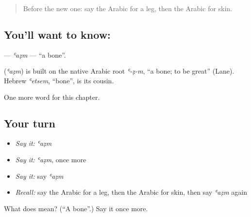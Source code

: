 \label{lesson:AR-C141-azm}



\begin{quote}
Before the new one: say the Arabic for a leg, then the Arabic for skin.
\end{quote}

\subsection*{You'll want to know: }
\textbf{} — \emph{ʿaẓm} — \textquotedblleft{}a bone\textquotedblright{}.

\begin{cousinweb}
\textbf{} (\emph{ʿaẓm}) is built on the native Arabic root \emph{ʿ-ẓ-m}, \textquotedblleft{}a bone; to be great\textquotedblright{} (Lane). Hebrew \emph{ʿetsem}, \textquotedblleft{}bone\textquotedblright{}, is its cousin.
\end{cousinweb}

\begin{grammarlens}[title={What you've built}]
One more word for this chapter.
\end{grammarlens}

\subsection*{Your turn}
\begin{itemize}
\raggedright
  \item \emph{Say it:} \emph{ʿaẓm}
  \item \emph{Say it:} \emph{ʿaẓm}, once more
  \item \emph{Say it:} say \emph{ʿaẓm}
  \item \emph{Recall:} say the Arabic for a leg, then the Arabic for skin, then say \emph{ʿaẓm} again
\end{itemize}

\begin{tcolorbox}[breakable,colback=teal!4,colframe=teal!35!black,title={Before you move on}]
What does  mean? (\textquotedblleft{}A bone\textquotedblright{}.) Say it once more.
\end{tcolorbox}
